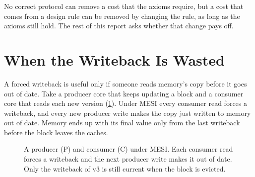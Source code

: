 No correct protocol can remove a cost that the axioms require, but a cost that
comes from a design rule can be removed by changing the rule, as long as the
axioms still hold. The rest of this report asks whether that change pays off.

\section{When the Writeback Is Wasted}
\label{sec:dirty-wasted}
%

A forced writeback is useful only if someone reads memory's copy before it goes
out of date. Take a producer core that keeps updating a block and a consumer core
that reads each new version (\cref{fig:wasted-timeline}). Under MESI every consumer
read forces a writeback, and every new producer write makes the copy just written
to memory out of date. Memory ends up with its final value only from the last
writeback before the block leaves the caches.

\begin{figure}[htbp]
\centering
\begin{bigfig}
\end{bigfig}
\caption[Superseded writebacks]{A producer (P) and consumer (C) under MESI. Each
consumer read forces a writeback and the next producer write makes it out of date.
Only the writeback of v3 is still current when the block is evicted.}
\label{fig:wasted-timeline}
\end{figure}

